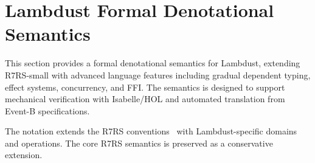 \section{Lambdust Formal Denotational Semantics}
\label{lambdustformalsemanticssection}

\bgroup

\newcommand{\sembrack}[1]{[\![#1]\!]}
\newcommand{\fun}[1]{\hbox{\it #1}}
\newenvironment{semfun}{\begin{tabbing}$}{$\end{tabbing}}
\newcommand\LOC{{\tt{}L}}
\newcommand\NAT{{\tt{}N}}
\newcommand\TRU{{\tt{}T}}
\newcommand\SYM{{\tt{}Q}}
\newcommand\CHR{{\tt{}H}}
\newcommand\NUM{{\tt{}R}}
\newcommand\FUN{{\tt{}F}}
\newcommand\EXP{{\tt{}E}}
\newcommand\STV{{\tt{}E}}
\newcommand\STO{{\tt{}S}}
\newcommand\ENV{{\tt{}U}}
\newcommand\ANS{{\tt{}A}}
\newcommand\ERR{{\tt{}X}}
\newcommand\DP{\tt{P}}
\newcommand\EC{{\tt{}K}}
\newcommand\CC{{\tt{}C}}
\newcommand\MSC{{\tt{}M}}
\newcommand\PAI{\hbox{\EXP$_{\rm p}$}}
\newcommand\VEC{\hbox{\EXP$_{\rm v}$}}
\newcommand\STR{\hbox{\EXP$_{\rm s}$}}

\newcommand\TYP{{\tt{}T}}     %
\newcommand\EFF{{\tt{}F}}     %
\newcommand\MON{{\tt{}M}}     %
\newcommand\ACT{{\tt{}A}}     %
\newcommand\CON{{\tt{}C}}     %
\newcommand\FFI{{\tt{}I}}     %
\newcommand\DEP{{\tt{}D}}     %
\newcommand\PRF{{\tt{}P}}     %

\newcommand\elt{\downarrow}
\newcommand\drop{\dagger}
\newcommand{\wrong}[1]{\fun{wrong }\hbox{\rm``#1''}}
\newcommand{\go}[1]{\hbox{\hspace*{#1em}}}

This section provides a formal denotational semantics for Lambdust, extending R7RS-small with advanced language features including gradual dependent typing, effect systems, concurrency, and FFI. The semantics is designed to support mechanical verification with Isabelle/HOL and automated translation from Event-B specifications.

The notation extends the R7RS conventions~\cite{R7RS} with Lambdust-specific domains and operations. The core R7RS semantics is preserved as a conservative extension.

